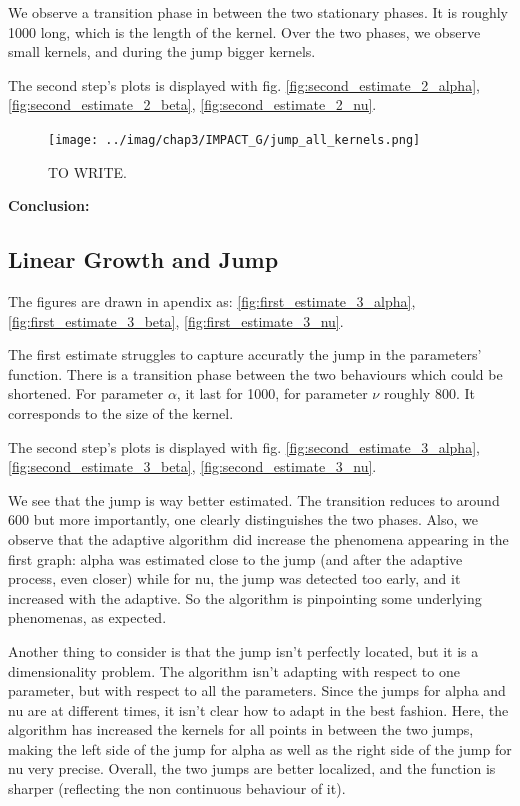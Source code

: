 \documentclass[11pt]{book}
\begin{document}
We observe a transition phase in between the two stationary phases. It is roughly 1000 long, which is the length of the kernel. Over the two phases, we observe small kernels, and during the jump bigger kernels.

The second step's plots is displayed with fig. \ref{fig:second_estimate_2_alpha}, \ref{fig:second_estimate_2_beta}, \ref{fig:second_estimate_2_nu}.

\begin{figure}
\centering
\texttt{[image: ../imag/chap3/IMPACT\_G/jump\_all\_kernels.png]}
\caption{TO WRITE.}
\label{fig:impact_g_jump}
\end{figure}


\textbf{Conclusion:}





\subsection{Linear Growth and Jump}
The figures are drawn in apendix as: \ref{fig:first_estimate_3_alpha}, \ref{fig:first_estimate_3_beta}, \ref{fig:first_estimate_3_nu}.

The first estimate struggles to capture accuratly the jump in the parameters' function. There is a transition phase between the two behaviours which could be shortened. For parameter $\alpha$, it last for 1000, for parameter $\nu$ roughly 800. It corresponds to the size of the kernel.

The second step's plots is displayed with fig.  \ref{fig:second_estimate_3_alpha}, \ref{fig:second_estimate_3_beta}, \ref{fig:second_estimate_3_nu}.

We see that the jump is way better estimated. The transition reduces to around 600 but more importantly, one clearly distinguishes the two phases. Also, we observe that the adaptive algorithm did increase the phenomena appearing in the first graph: alpha was estimated close to the jump (and after the adaptive process, even closer) while for nu, the jump was detected too early, and it increased with the adaptive. So the algorithm is pinpointing some underlying phenomenas, as expected.

Another thing to consider is that the jump isn't perfectly located, but it is a dimensionality problem. The algorithm isn't adapting with respect to one parameter, but with respect to all the parameters. Since the jumps for alpha and nu are at different times, it isn't clear how to adapt in the best fashion. Here, the algorithm has increased the kernels for all points in between the two jumps, making the left side of the jump for alpha as well as the right side of the jump for nu very precise. Overall, the two jumps are better localized, and the function is sharper (reflecting the non continuous behaviour of it).
\end{document}
